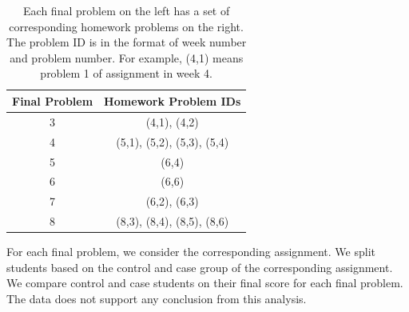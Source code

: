 \documentclass{llncs2e/llncs}
\begin{document}
\begin{table}[h]
\caption{Each final problem on the left has a set of corresponding homework problems on the right. The problem ID is in the format of week number and problem number. For example, (4,1) means problem 1 of assignment in week 4.}
\begin{center}
  \begin{tabular}{ c | c }
   Final Problem & Homework Problem IDs \\ \hline
	3 & (4,1), (4,2) \\
	4 & (5,1), (5,2), (5,3), (5,4) \\
    5 & (6,4) \\
    6 & (6,6) \\
    7 & (6,2), (6,3) \\
    8 & (8,3), (8,4), (8,5), (8,6) \\ \hline
  \end{tabular}
  \label{tab:map}
  \end{center}
\end{table}
\fi

For each final problem, we consider the corresponding assignment. We split students based on the control and case group of the corresponding assignment. We compare control and case students on their final score for each final problem. The data does not support any conclusion from this analysis.

\end{document}
